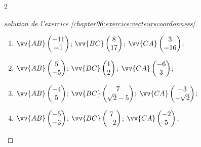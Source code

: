 \documentclass[main.tex]{subfiles}
\begin{document}
\begin{multicols}{2}  
	\begin{proof}[solution de l'exercice \ref{chapter06:exercice:vecteurscoordonnees}]\hfill 
		\begin{enumerate}[leftmargin=*,label=\alph*)] 
			\item  $\vv{AB}\begin{pmatrix}
				-11\\-1
			\end{pmatrix}$;
			$\vv{BC}\begin{pmatrix}
				8\\17
			\end{pmatrix}$;
			$\vv{CA}\begin{pmatrix}
				3\\-16
			\end{pmatrix}$;
			\item  $\vv{AB}\begin{pmatrix}
				5\\-5
			\end{pmatrix}$;
			$\vv{BC}\begin{pmatrix}
				1\\2
			\end{pmatrix}$;
			$\vv{CA}\begin{pmatrix}
				-6\\3
			\end{pmatrix}$;
			\item  $\vv{AB}\begin{pmatrix}
				-4\\5
			\end{pmatrix}$;
			$\vv{BC}\begin{pmatrix}
				7\\\sqrt{2}-5
			\end{pmatrix}$;
			$\vv{CA}\begin{pmatrix}
				-3\\-\sqrt{2}
			\end{pmatrix}$;
			\item  $\vv{AB}\begin{pmatrix}
				-5\\-3
			\end{pmatrix}$;
			$\vv{BC}\begin{pmatrix}
				7\\-2
			\end{pmatrix}$;
			$\vv{CA}\begin{pmatrix}
				-2\\5 
			\end{pmatrix}$;

\end{enumerate}
\end{proof}
\end{multicols}
\end{document}
